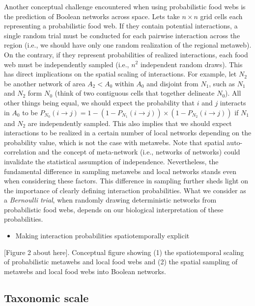 \documentclass[10pt,oneside]{article}
\begin{document}
Another conceptual challenge encountered when using probabilistic food
webs is the prediction of Boolean networks across space. Lets take
\(n \times n\) grid cells each representing a probabilistic food web. If
they contain potential interactions, a single random trial must be
conducted for each pairwise interaction across the region (i.e., we
should have only one random realization of the regional metaweb). On the
contrary, if they represent probabilities of realized interactions, each
food web must be independently sampled (i.e., \(n^2\) independent random
draws). This has direct implications on the spatial scaling of
interactions. For example, let \(N_2\) be another network of area
\(A_2 < A_0\) within \(A_0\) and disjoint from \(N_1\), such as \(N_1\)
and \(N_2\) form \(N_0\) (think of two contiguous cells that together
delineate \(N_0\)). All other things being equal, we should expect the
probability that \(i\) and \(j\) interacts in \(A_0\) to be
\(P_{N_0}(i \rightarrow j) = 1 - (1 - P_{N_1}(i \rightarrow j)) \times (1 - P_{N_2}(i \rightarrow j))\)
if \(N_1\) and \(N_2\) are independently sampled. This also implies that
we should expect interactions to be realized in a certain number of
local networks depending on the probability value, which is not the case
with metawebs. Note that spatial auto-correlation and the concept of
meta-network (i.e., networks of networks) could invalidate the
statistical assumption of independence. Nevertheless, the fundamental
difference in sampling metawebs and local networks stands even when
considering these factors. This difference in sampling further sheds
light on the importance of clearly defining interaction probabilities.
What we consider as a \emph{Bernoulli trial}, when randomly drawing
deterministic networks from probabilistic food webs, depends on our
biological interpretation of these probabilities.

\begin{itemize}
\tightlist
\item
  Making interaction probabilities spatiotemporally explicit
\end{itemize}

{[}Figure 2 about here{]}. Conceptual figure showing (1) the
spatiotemporal scaling of probabilistic metawebs and local food webs and
(2) the spatial sampling of metawebs and local food webs into Boolean
networks.

\hypertarget{taxonomic-scale}{%
\subsection{Taxonomic scale}\label{taxonomic-scale}}
\end{document}
